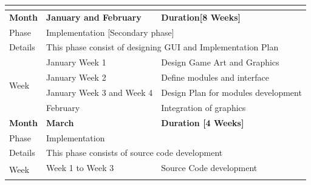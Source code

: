\documentclass[oneside,a4paper,12pt]{report}
\begin{document}
\begin{table}[h!]
\begin{center}
\begin{tabular}{|l|l|l|}
\\ \hline
\multicolumn{3}{|l|}{}                                                                                                                                                                \\ \hline
\textbf{Month}        & \textbf{January and February}      & \textbf{Duration{[}8 Weeks{]}}                                                                                           \\ \hline
Phase                 & \multicolumn{2}{|l|}{Implementation {[}Secondary phase{]}}                                                                                                    \\ \hline
Details               & \multicolumn{2}{|l|}{This phase consist of designing GUI and Implementation Plan}                                                                             \\ \hline
\multirow{4}{*}{Week} & January Week 1                     & Design Game Art and Graphics                                                                                                                \\ \cline{2-3} 
                      & January Week 2                     & Define modules and interface                                                                                             \\ \cline{2-3} 
                      & January Week 3 and Week 4          & Design Plan for modules development                                                                                      \\ \cline{2-3} 
                      & February                           & Integration of graphics
\\ \hline 
\textbf{Month}        & \textbf{March}                     & \textbf{Duration {[}4 Weeks{]}}                                                                                          \\ \hline
Phase                 & \multicolumn{2}{|l|}{Implementation}                                                                                                                          \\ \hline
Details               & \multicolumn{2}{|l|}{This phase consists of source code development}                                                                                          \\ \hline
\multirow{2}{*}{Week} & Week 1 to Week 3                   & Source Code development                                                                                                  \\ \cline{2-3} 

\end{tabular}
\end{center}
\end{table}
\end{document}
